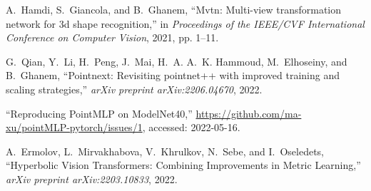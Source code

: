 \documentclass{article}
\begin{document}
\begin{thebibliography}{10}
A.~Hamdi, S.~Giancola, and B.~Ghanem, ``{Mvtn: Multi-view transformation
  network for 3d shape recognition},'' in \emph{Proceedings of the IEEE/CVF
  International Conference on Computer Vision}, 2021, pp. 1--11.

G.~Qian, Y.~Li, H.~Peng, J.~Mai, H.~A. A.~K. Hammoud, M.~Elhoseiny, and
  B.~Ghanem, ``Pointnext: Revisiting pointnet++ with improved training and
  scaling strategies,'' \emph{arXiv preprint arXiv:2206.04670}, 2022.

``{Reproducing PointMLP on ModelNet40},''
  \url{https://github.com/ma-xu/pointMLP-pytorch/issues/1}, accessed:
  2022-05-16.

A.~Ermolov, L.~Mirvakhabova, V.~Khrulkov, N.~Sebe, and I.~Oseledets,
  ``{Hyperbolic Vision Transformers: Combining Improvements in Metric
  Learning},'' \emph{arXiv preprint arXiv:2203.10833}, 2022.

\end{thebibliography}
\end{document}
